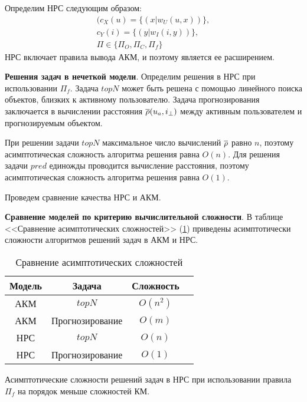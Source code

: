 %
Определим НРС следующим образом:
	\begin{multline}
		(c_X(u) = \{(x | w_U(u, x )) \},\\
		 c_Y(i) = \{(y | w_I(i, y )) \},\\
		\Pi \in \{\Pi_{O}, \Pi_{C}, \Pi_f\}
	\end{multline}
НРС включает правила вывода АКМ,
и поэтому является ее расширением.

{\bf Решения задач в нечеткой модели}.
Определим решения в НРС при использовании $\Pi_f$. Задача $topN$ может быть решена
с помощью линейного поиска объектов, близких к активному пользователю.
Задача прогнозирования заключается в вычислении расстояния $\overline{\rho}(u_a, i_{\bot})$ между
активным пользователем и прогнозируемым объектом.

При решении задачи $topN$ максимальное число вычислений $\overline{\rho}$ равно $n$,
поэтому асимптотическая сложность алгоритма решения равна $O(n)$. Для решения
задачи $pred$ единожды проводится вычисление расстояния,
поэтому асимптотическая сложность алгоритма решения равна $O(1)$.

Проведем сравнение качества НРС и АКМ.

{\bf Сравнение моделей по критерию вычислительной сложности}.
В таблице <<Сравнение асимптотических сложностей>> (\ref{tbl:complex})
приведены асимптотически сложности алгоритмов решений задач в АКМ и НРС.

\begin{table}[h]
	\caption{Сравнение асимптотических сложностей}
	\label{tbl:complex}
  \begin{center}
  \begin{tabular}{|c|c|c|c|}
	\hline
	Модель & Задача & Сложность  \\ \hline
	АКМ & $topN$ & $O(n^2)$  \\ \hline
	АКМ & Прогнозирование & $O(m)$ \\ \hline
	НРС & $topN$ & $O(n)$ \\ \hline
	НРС & Прогнозирование & $O(1)$ \\ \hline
  \end{tabular}
\end{center}
\end{table}
Асимптотические сложности решений задач в НРС
при использовании правила $\Pi_f$ на порядок меньше сложностей
КМ.

